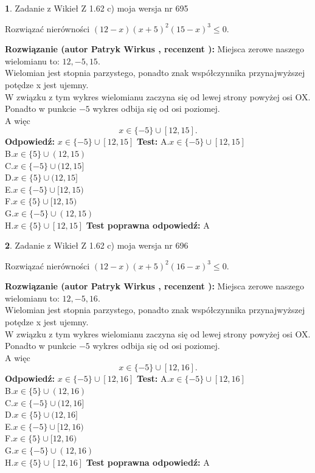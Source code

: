 \documentclass[12pt, a4paper]{article}
\theoremstyle{definition} %
\newtheorem{zad}{}
\newcommand{\zadStart}[1]{\begin{zad}#1\newline}
\newcommand{\zadStop}{\end{zad}}
\newcommand{\rozwStart}[2]{\noindent \textbf{Rozwiązanie (autor #1 , recenzent #2): }\newline}
\newcommand{\rozwStop}{\newline}
\newcommand{\odpStart}{\noindent \textbf{Odpowiedź:}\newline}
\newcommand{\odpStop}{\newline}
\newcommand{\testStart}{\noindent \textbf{Test:}\newline}
\newcommand{\testStop}{\newline}
\newcommand{\kluczStart}{\noindent \textbf{Test poprawna odpowiedź:}\newline}
\newcommand{\kluczStop}{\newline}
\begin{document}
\zadStart{Zadanie z Wikieł Z 1.62 c) moja wersja nr 695}

Rozwiązać nierówności $(12-x)(x+5)^{2}(15-x)^{3}\le0$.
\zadStop
\rozwStart{Patryk Wirkus}{}
Miejsca zerowe naszego wielomianu to: $12, -5, 15$.\\
Wielomian jest stopnia parzystego, ponadto znak współczynnika przy\linebreak najwyższej potędze x jest ujemny.\\ W związku z tym wykres wielomianu zaczyna się od lewej strony powyżej osi OX.\\
Ponadto w punkcie $-5$ wykres odbija się od osi poziomej.\\
A więc $$x \in \{-5\} \cup [12,15].$$
\rozwStop
\odpStart
$x \in \{-5\} \cup [12,15]$
\odpStop
\testStart
A.$x \in \{-5\} \cup [12,15]$\\
B.$x \in \{5\} \cup (12,15)$\\
C.$x \in \{-5\} \cup (12,15]$\\
D.$x \in \{5\} \cup (12,15]$\\
E.$x \in \{-5\} \cup [12,15)$\\
F.$x \in \{5\} \cup [12,15)$\\
G.$x \in \{-5\} \cup (12,15)$\\
H.$x \in \{5\} \cup [12,15]$
\testStop
\kluczStart
A
\kluczStop



\zadStart{Zadanie z Wikieł Z 1.62 c) moja wersja nr 696}

Rozwiązać nierówności $(12-x)(x+5)^{2}(16-x)^{3}\le0$.
\zadStop
\rozwStart{Patryk Wirkus}{}
Miejsca zerowe naszego wielomianu to: $12, -5, 16$.\\
Wielomian jest stopnia parzystego, ponadto znak współczynnika przy\linebreak najwyższej potędze x jest ujemny.\\ W związku z tym wykres wielomianu zaczyna się od lewej strony powyżej osi OX.\\
Ponadto w punkcie $-5$ wykres odbija się od osi poziomej.\\
A więc $$x \in \{-5\} \cup [12,16].$$
\rozwStop
\odpStart
$x \in \{-5\} \cup [12,16]$
\odpStop
\testStart
A.$x \in \{-5\} \cup [12,16]$\\
B.$x \in \{5\} \cup (12,16)$\\
C.$x \in \{-5\} \cup (12,16]$\\
D.$x \in \{5\} \cup (12,16]$\\
E.$x \in \{-5\} \cup [12,16)$\\
F.$x \in \{5\} \cup [12,16)$\\
G.$x \in \{-5\} \cup (12,16)$\\
H.$x \in \{5\} \cup [12,16]$
\testStop
\kluczStart
A
\kluczStop
\end{document}

